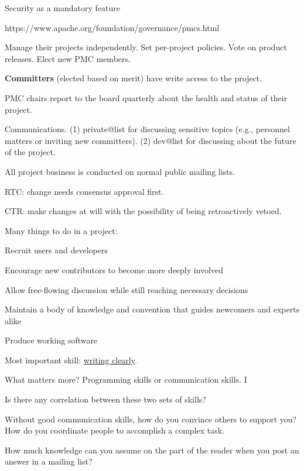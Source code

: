 \documentclass[landscape,30pt]{foils}
\begin{document}
Security as a mandatory feature



https://www.apache.org/foundation/governance/pmcs.html

Manage their projects independently.  Set per-project policies.  Vote on product releases.  Elect new PMC members.

{\bf Committers} (elected based on merit) have write access to the project.

PMC chairs report to the board quarterly about the health and status of their project.

Communications.  (1) private@list for discussing sensitive topics (e.g., personnel matters or inviting new committers). (2) dev@list for discussing about the future of the project.

All project business is conducted on normal public mailing lists.


RTC: change needs consensus approval first.

CTR: make changes at will with the possibility of being retroactively vetoed.



Many things to do in a project:

Recruit users and developers

Encourage new contributors to become more deeply involved

Allow free-flowing discussion while still reaching necessary decisions

Maintain a body of knowledge and convention that guides newcomers and experts alike

Produce working software


Most important skill: \underline{writing clearly}.

What matters more? Programming skills or communication skills.  I

Is there any correlation between these two sets of skills?

Without good communication skills, how do you convince others to support you?  How do you coordinate people to accomplish a complex task.

How much knowledge can you assume on the part of the reader when you post an answer in a mailing list?
\end{document}
